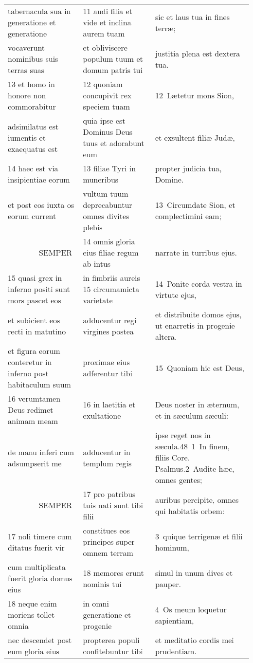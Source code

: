 \documentclass{article}
\begin{document}
\begin{longtable}{@{}p{}p{}p{}@{}}
tabernacula sua in generatione et generatione	&	11 audi filia et vide et inclina aurem tuam	&	sic et laus tua in fines terræ;	\\
vocaverunt nominibus suis terras suas	&	et obliviscere populum tuum et domum patris tui	&	justitia plena est dextera tua.	\\
13 et homo in honore non commorabitur	&	12 quoniam concupivit rex speciem tuam	&	12 Lætetur mons Sion,	\\
adsimilatus est iumentis et exaequatus est	&	quia ipse est Dominus Deus tuus et adorabunt eum	&	et exsultent filiæ Judæ,	\\
14 haec est via insipientiae eorum	&	13 filiae Tyri in muneribus	&	propter judicia tua, Domine.	\\
et post eos iuxta os eorum current	&	vultum tuum deprecabuntur omnes divites plebis	&	13 Circumdate Sion, et complectimini eam;	\\
    SEMPER	&	14 omnis gloria eius filiae regum ab intus	&	narrate in turribus ejus.	\\
15 quasi grex in inferno positi sunt mors pascet eos	&	in fimbriis aureis 15 circumamicta varietate	&	14 Ponite corda vestra in virtute ejus,	\\
et subicient eos recti in matutino	&	adducentur regi virgines postea	&	et distribuite domos ejus, ut enarretis in progenie altera.	\\
et figura eorum conteretur in inferno post habitaculum suum	&	proximae eius adferentur tibi	&	15 Quoniam hic est Deus,	\\
16 verumtamen Deus redimet animam meam	&	16 in laetitia et exultatione	&	Deus noster in æternum, et in sæculum sæculi:	\\
de manu inferi cum adsumpserit me	&	adducentur in templum regis	&	ipse reget nos in sæcula.48 1 In finem, filiis Core. Psalmus.2 Audite hæc, omnes gentes;	\\
    SEMPER	&	17 pro patribus tuis nati sunt tibi filii	&	auribus percipite, omnes qui habitatis orbem:	\\
17 noli timere cum ditatus fuerit vir	&	constitues eos principes super omnem terram	&	3 quique terrigenæ et filii hominum,	\\
cum multiplicata fuerit gloria domus eius	&	18 memores erunt nominis tui	&	simul in unum dives et pauper.	\\
18 neque enim moriens tollet omnia	&	in omni generatione et progenie	&	4 Os meum loquetur sapientiam,	\\
nec descendet post eum gloria eius	&	propterea populi confitebuntur tibi	&	et meditatio cordis mei prudentiam.	\\

\end{longtable}
\end{document}
